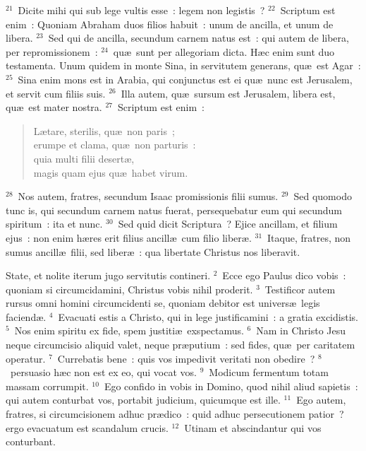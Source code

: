 ${}^{21}$~Dicite mihi qui sub lege vultis esse~: legem non legistis~?
${}^{22}$~Scriptum est enim~: Quoniam Abraham duos filios habuit~: unum de ancilla, et unum de libera.
${}^{23}$~Sed qui de ancilla, secundum carnem natus est~: qui autem de libera, per repromissionem~:
${}^{24}$~qu\ae\ sunt per allegoriam dicta. H\ae c enim sunt duo testamenta. Unum quidem in monte Sina, in servitutem generans, qu\ae\ est Agar~:
${}^{25}$~Sina enim mons est in Arabia, qui conjunctus est ei qu\ae\ nunc est Jerusalem, et servit cum filiis suis.
${}^{26}$~Illa autem, qu\ae\ sursum est Jerusalem, libera est, qu\ae\ est mater nostra.
${}^{27}$~Scriptum est enim~: \begin{flushleft}\begin{verse}L\ae tare, sterilis, qu\ae\ non paris~;\\ erumpe et clama, qu\ae\ non parturis~:\\ quia multi filii desert\ae ,\\ magis quam ejus qu\ae\ habet virum.\end{verse}\end{flushleft}


${}^{28}$~Nos autem, fratres, secundum Isaac promissionis filii sumus.
${}^{29}$~Sed quomodo tunc is, qui secundum carnem natus fuerat, persequebatur eum qui secundum spiritum~: ita et nunc.
${}^{30}$~Sed quid dicit Scriptura~? Ejice ancillam, et filium ejus~: non enim h\ae res erit filius ancill\ae\ cum filio liber\ae .
${}^{31}$~Itaque, fratres, non sumus ancill\ae\ filii, sed liber\ae~: qua libertate Christus nos liberavit.

\lettrine[lines=10,image=true,loversize=0.05,lraise=-0.03]{S}{}tate, et nolite iterum jugo servitutis contineri.
${}^{2}$~Ecce ego Paulus dico vobis~: quoniam si circumcidamini, Christus vobis nihil proderit.
${}^{3}$~Testificor autem rursus omni homini circumcidenti se, quoniam debitor est univers\ae\ legis faciend\ae .
${}^{4}$~Evacuati estis a Christo, qui in lege justificamini~: a gratia excidistis.
${}^{5}$~Nos enim spiritu ex fide, spem justiti\ae\ exspectamus.
${}^{6}$~Nam in Christo Jesu neque circumcisio aliquid valet, neque pr\ae putium~: sed fides, qu\ae\ per caritatem operatur.
${}^{7}$~Currebatis bene~: quis vos impedivit veritati non obedire~?
${}^{8}$~persuasio h\ae c non est ex eo, qui vocat vos.
${}^{9}$~Modicum fermentum totam massam corrumpit.
${}^{10}$~Ego confido in vobis in Domino, quod nihil aliud sapietis~: qui autem conturbat vos, portabit judicium, quicumque est ille.
${}^{11}$~Ego autem, fratres, si circumcisionem adhuc pr\ae dico~: quid adhuc persecutionem patior~? ergo evacuatum est scandalum crucis.
${}^{12}$~Utinam et abscindantur qui vos conturbant.


